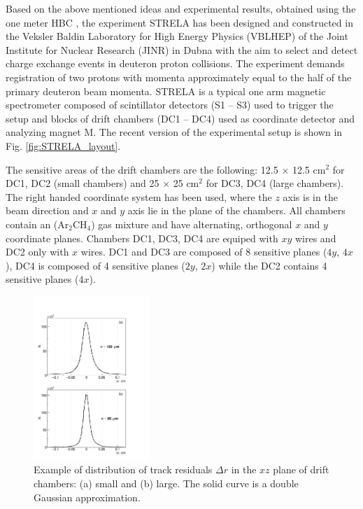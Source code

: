 \documentclass[twocolumn,epjc3]{svjour3}
\begin{document}
Based on the above mentioned ideas and experimental results, obtained using the
one meter HBC \cite{gla02,gla08}, the experiment STRELA has been designed and
constructed in the Veksler Baldin Laboratory for High Energy Physics (VBLHEP) of
the Joint Institute for Nuclear Research (JINR) in Dubna with the aim to select
and detect charge exchange events in deuteron proton collisions. The experiment
demands registration of two protons with momenta approximately equal to the half
of the primary deuteron beam momenta. STRELA is a typical one arm magnetic
spectrometer composed of scintillator detectors (S1 -- S3) used to trigger the
setup and blocks of drift chambers (DC1 -- DC4) used as coordinate detector and
analyzing magnet M. The recent version of the experimental setup is shown in
Fig. \ref{fig:STRELA_layout}.

The sensitive areas of the drift chambers are the following: 12.5 $\times$ 12.5
cm$^2$ for DC1, DC2 (small chambers) and 25 $\times$ 25 cm$^2$ for DC3, DC4
(large chambers). The right handed coordinate system has been used, where the
$z$ axis is in the beam direction and $x$ and $y$ axis lie in the plane of the
chambers. All chambers contain an (Ar$_2$CH$_4$) gas mixture and have
alternating, orthogonal $x$ and $y$ coordinate planes. Chambers DC1, DC3, DC4
are equiped with $xy$ wires and DC2 only with $x$ wires. DC1 and DC3 are
composed of 8 sensitive planes ($4y$, $4x$), DC4 is composed of 4 sensitive
planes ($2y$, $2x$) while the DC2 contains 4 sensitive planes ($4x$).

\begin{figure}[ht]
  \centering
  \includegraphics[width=0.39\textwidth]{res_chambers.pdf} %
  \caption{Example of distribution of track residuals $\Delta r$ in the $xz$
    plane of drift chambers: (a) small and (b) large. The solid curve is a
    double Gaussian approximation.}
  \label{fig:res_chambers}
\end{figure}
\end{document}
